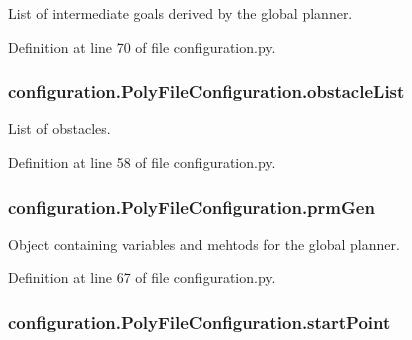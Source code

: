 List of intermediate goals derived by the global planner. 



Definition at line 70 of file configuration.\-py.

\hypertarget{classconfiguration_1_1PolyFileConfiguration_a4ea5eea95680f3bfdad4adce0578a0f0}{
\subsubsection[{obstacle\-List}]{\setlength{\rightskip}{0pt plus 5cm}configuration.\-Poly\-File\-Configuration.\-obstacle\-List}}\label{classconfiguration_1_1PolyFileConfiguration_a4ea5eea95680f3bfdad4adce0578a0f0}


List of obstacles. 



Definition at line 58 of file configuration.\-py.

\hypertarget{classconfiguration_1_1PolyFileConfiguration_a075aa5177145a1041468f24e4829e8e8}{
\subsubsection[{prm\-Gen}]{\setlength{\rightskip}{0pt plus 5cm}configuration.\-Poly\-File\-Configuration.\-prm\-Gen}}\label{classconfiguration_1_1PolyFileConfiguration_a075aa5177145a1041468f24e4829e8e8}


Object containing variables and mehtods for the global planner. 



Definition at line 67 of file configuration.\-py.

\hypertarget{classconfiguration_1_1PolyFileConfiguration_ae5c780baacd4b800d1646a29a8608cbf}{
\subsubsection[{start\-Point}]{\setlength{\rightskip}{0pt plus 5cm}configuration.\-Poly\-File\-Configuration.\-start\-Point}}\label{classconfiguration_1_1PolyFileConfiguration_ae5c780baacd4b800d1646a29a8608cbf}


